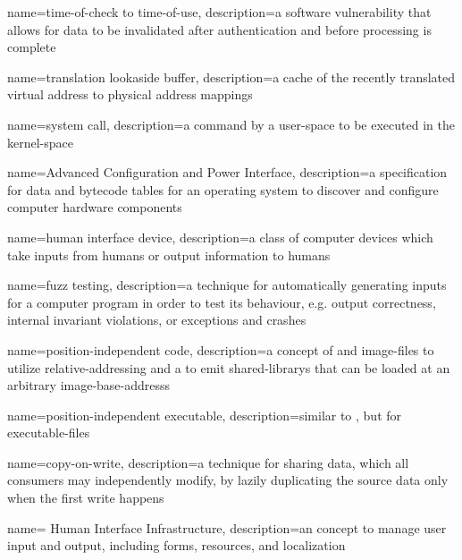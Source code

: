 {
  name={time-of-check to time-of-use},
  description={a software vulnerability that allows for data to be invalidated after authentication and before processing is complete}
}

{
  name={translation lookaside buffer},
  description={a cache of the recently translated virtual address to physical address mappings}
}

{
  name={system call},
  description={a command by a \gls{user-space} to be executed in the \gls{kernel-space}}
}

{
  name={Advanced Configuration and Power Interface},
  description={a specification for data and bytecode tables for an operating system to discover and configure computer hardware components}
}

{
  name={human interface device},
  description={a class of computer devices which take inputs from humans or output information to humans}
}

{
  name={fuzz testing},
  description={a technique for automatically generating inputs for a computer program in order to test its behaviour, e.g. output correctness, internal invariant violations, or exceptions and crashes}
}

{
  name={position-independent code},
  description={a concept of  and  \glspl{image-file} to utilize \gls{relative-addressing} and a  to emit \glspl{shared-library} that can be loaded at an arbitrary \glspl{image-base-address}}
}

{
  name={position-independent executable},
  description={similar to , but for \glspl{executable-file}}
}

{
  name={copy-on-write},
  description={a technique for sharing data, which all consumers may independently modify, by lazily duplicating the source data only when the first write happens}
}

{
  name={ Human Interface Infrastructure},
  description={an  concept to manage user input and output, including forms, resources, and localization}
}

